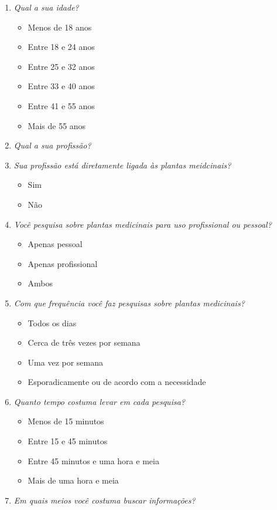 \begin{enumerate}
\def\labelenumi{\arabic{enumi}.}
\item
  \emph{Qual a sua idade?}

  \begin{itemize}
  \tightlist
  \item
    Menos de 18 anos
  \item
    Entre 18 e 24 anos
  \item
    Entre 25 e 32 anos
  \item
    Entre 33 e 40 anos
  \item
    Entre 41 e 55 anos
  \item
    Mais de 55 anos
  \end{itemize}
\item
  \emph{Qual a sua profissão?}
\item
  \emph{Sua profissão está diretamente ligada às plantas meidcinais?}

  \begin{itemize}
  \tightlist
  \item
    Sim
  \item
    Não
  \end{itemize}
\item
  \emph{Você pesquisa sobre plantas medicinais para uso profissional ou pessoal?}

  \begin{itemize}
  \tightlist
  \item
    Apenas pessoal
  \item
    Apenas profissional
  \item
    Ambos
  \end{itemize}
\item
  \emph{Com que frequência você faz pesquisas sobre plantas medicinais?}

  \begin{itemize}
  \tightlist
  \item
    Todos os dias
  \item
    Cerca de três vezes por semana
  \item
    Uma vez por semana
  \item
    Esporadicamente ou de acordo com a necessidade
  \end{itemize}
\item
  \emph{Quanto tempo costuma levar em cada pesquisa?}

  \begin{itemize}
  \tightlist
  \item
    Menos de 15 minutos
  \item
    Entre 15 e 45 minutos
  \item
    Entre 45 minutos e uma hora e meia
  \item
    Mais de uma hora e meia
  \end{itemize}
\item
  \emph{Em quais meios você costuma buscar informações?}


\end{enumerate}
